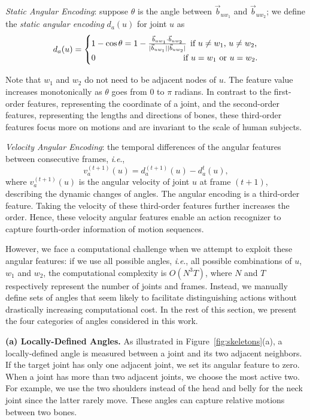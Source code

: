 \documentclass[journal,comsoc]{IEEEtran}
\newcommand{\ie}{\textit{i}.\textit{e}.,}
\begin{document}
\textit{Static Angular Encoding}:
suppose $\theta$ is the angle between $\vec{b}_{uw_1}$ and $\vec{b}_{uw_2}$; we define the \emph{static angular encoding} $d_a(u)$ for joint $u$ as 
\begin{align}
    d_a(u)  
    = 
    \begin{cases}
      1 - \cos \theta = 
      1 - \frac{ \vec{b}_{uw_1}\cdot\vec{b}_{uw_2} }{ |\vec{b}_{uw_1}| |\vec{b}_{uw_2}| }  & \hspace{-2mm} \text{if $u \ne w_1$, $u \ne w_2$,}\\
      0 & \hspace{-5mm} \text{if $u = w_1$ or $u = w_2$.}
    \end{cases}
\end{align}

Note that $w_1$ and $w_2$ do not need to be adjacent nodes of $u$. The feature value increases monotonically as $\theta$ goes from $0$ to $\pi$ radians. 
In contrast to the first-order features, representing the coordinate of a joint, and the second-order features, representing the lengths and directions of bones, these third-order features focus more on motions and are invariant to the scale of human subjects. 

\textit{Velocity Angular Encoding}: the temporal differences of the angular features between consecutive frames, \ie
\begin{equation}
    v_a^{(t+1)}(u) = d_a^{(t+1)}(u) - d_a^{t}(u),
\end{equation}
where $v_a^{(t+1)}(u)$ is the angular velocity of joint $u$ at frame $(t+1)$, describing the dynamic changes of angles. The angular encoding is a third-order feature. Taking the velocity of these third-order features further increases the order. Hence, these velocity angular features enable an action recognizer to capture fourth-order information of motion sequences. 

However, we face a computational challenge when we attempt to exploit these angular features: if we use all possible angles, \ie{} all possible combinations of $u$, $w_1$ and $w_2$, the computational complexity is $O(N^3 T)$, where $N$ and $T$ respectively represent the number of joints and frames.
Instead, we manually define sets of angles that seem likely to facilitate distinguishing actions without drastically increasing computational cost. In the rest of this section, we present the four categories of angles considered in this work.

\textbf{(a) Locally-Defined Angles.} As illustrated in Figure~\ref{fig:skeletons}(a), a locally-defined angle is measured between a joint and its two adjacent neighbors. If the target joint has only one adjacent joint, we set its angular feature to zero. When a joint has more than two adjacent joints, we choose the most active two. For example, we use the two shoulders instead of the head and belly for the neck joint since the latter rarely move. 
These angles can capture relative motions between two bones. 
\end{document}
